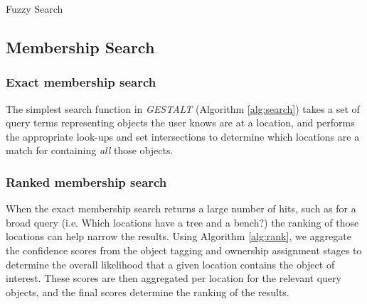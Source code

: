 \begin{algorithm}
    \caption{Fuzzy Search}\label{alg:fuzzySearch}
    \begin{algorithmic}[2]
        \State{- - - - -}
                \Else
                \EndIf
            \EndIf
            \EndIf
        \EndProcedure
    \end{algorithmic}
\end{algorithm}


\subsection{Membership Search}

\subsubsection{Exact membership search}
The simplest search function in \emph{GESTALT} (Algorithm \ref{alg:search}) takes a set of query terms representing objects the user knows are at a location, and performs the appropriate look-ups and set intersections to determine which locations are a match for containing \textit{all} those objects. 

\subsubsection{Ranked membership search}
When the exact membership search returns a large number of hits, such as for a broad query (i.e. Which locations have a tree and a bench?) the ranking of those locations can help narrow the results. Using Algorithm \ref{alg:rank}, we aggregate the confidence scores from the object tagging and ownership assignment stages to determine the overall likelihood that a given location contains the object of interest. These scores are then aggregated per location for the relevant query objects, and the final scores determine the ranking of the results. 

